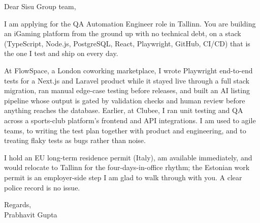 \documentclass[a4paper,11pt]{article}
\begin{document}
Dear Sisu Group team,

I am applying for the QA Automation Engineer role in Tallinn. You are building an iGaming platform from the ground up with no technical debt, on a stack (TypeScript, Node.js, PostgreSQL, React, Playwright, GitHub, CI/CD) that is the one I test and ship on every day.

At FlowSpace, a London coworking marketplace, I wrote Playwright end-to-end tests for a Next.js and Laravel product while it stayed live through a full stack migration, ran manual edge-case testing before releases, and built an AI listing pipeline whose output is gated by validation checks and human review before anything reaches the database. Earlier, at Clubee, I ran unit testing and QA across a sports-club platform's frontend and API integrations. I am used to agile teams, to writing the test plan together with product and engineering, and to treating flaky tests as bugs rather than noise.

I hold an EU long-term residence permit (Italy), am available immediately, and would relocate to Tallinn for the four-days-in-office rhythm; the Estonian work permit is an employer-side step I am glad to walk through with you. A clear police record is no issue.

Regards,\\
Prabhavit Gupta
\end{document}
